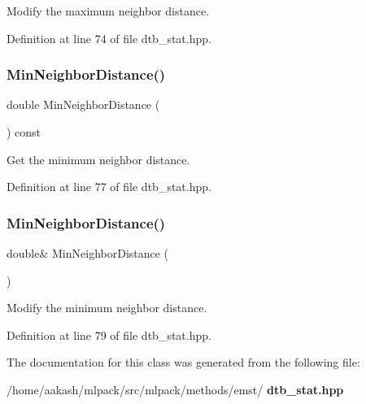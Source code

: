 Modify the maximum neighbor distance. 



Definition at line 74 of file dtb\+\_\+stat.\+hpp.

\mbox{\label{classmlpack_1_1emst_1_1DTBStat_a7d566fbeb953884df157bef4b07ab664}} 
\subsubsection{Min\+Neighbor\+Distance()\hspace{0.1cm}{\footnotesize\ttfamily [1/2]}}
{\footnotesize\ttfamily double Min\+Neighbor\+Distance (\begin{DoxyParamCaption}{ }\end{DoxyParamCaption}) const\hspace{0.3cm}{\ttfamily [inline]}}



Get the minimum neighbor distance. 



Definition at line 77 of file dtb\+\_\+stat.\+hpp.

\mbox{\label{classmlpack_1_1emst_1_1DTBStat_aa09dedc3377b0db900030d33270f7423}} 
\subsubsection{Min\+Neighbor\+Distance()\hspace{0.1cm}{\footnotesize\ttfamily [2/2]}}
{\footnotesize\ttfamily double\& Min\+Neighbor\+Distance (\begin{DoxyParamCaption}{ }\end{DoxyParamCaption})\hspace{0.3cm}{\ttfamily [inline]}}



Modify the minimum neighbor distance. 



Definition at line 79 of file dtb\+\_\+stat.\+hpp.



The documentation for this class was generated from the following file\+:\begin{DoxyCompactItemize}
\item 
/home/aakash/mlpack/src/mlpack/methods/emst/\textbf{ dtb\+\_\+stat.\+hpp}\end{DoxyCompactItemize}
